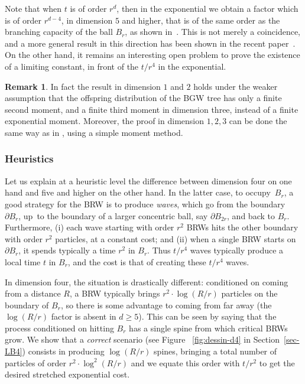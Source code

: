 \documentclass[11pt]{article}
\numberwithin{equation}{section}
\theoremstyle{plain}
\theoremstyle{definition}
\newtheorem{remark}[theorem]{Remark}
\newcommand{\1}{{\text{\Large $\mathfrak 1$}}}
\begin{document}
Note that when $t$ is of order $r^d$, then in the exponential we obtain a factor which is of order $r^{d-4}$, in dimension $5$ and higher, that is of the same order as the branching capacity of the ball $B_r$, as shown in~\cite{Zhu1}.
This is not merely a coincidence, and a more general result in this direction has been shown in the recent paper~\cite{ASS23}.
On the other hand, it remains an interesting open problem to prove the existence of a limiting constant, in front of the $t/r^4$ in the exponential.

\begin{remark}
In fact the result in dimension $1$ and $2$ holds under the weaker assumption that the offspring distribution of the BGW tree has only a finite second moment, and a finite third moment in dimension three, instead of a finite exponential moment. Moreover, the proof in dimension $1,2,3$ can be done the same way as in \cite{AHJ}, using a simple moment method.
\end{remark}

\subsubsection*{Heuristics}
Let us explain at a heuristic level the difference between
dimension four on one hand and five and higher on the other hand.
In the latter case, to occupy~$B_r$, a good strategy for the BRW is to produce
\emph{waves}, which go from the boundary~$\partial B_r$,
up~to the boundary of a larger concentric ball,
say $\partial B_{2r}$, and back to $B_r$.
Furthermore, (i) each wave starting with order $r^2$ BRWs
hits the other boundary with order $r^2$ particles, at a constant cost; and
(ii) when a single BRW starts on $\partial B_r$,
it spends typically a time $r^2$ in $B_r$.
Thus $t/r^4$ waves typically produce a local time $t$ in $B_r$, and
the cost is that of creating these $t/r^4$ waves.

In dimension four, the situation is drastically different: conditioned
on coming from a distance $R$, a BRW typically brings $r^2\cdot \log(R/r)$ particles on
the boundary of $B_r$, so there is some advantage to coming from
far away (the $\log(R/r)$ factor is absent in $d\ge 5$). This can be seen
by saying that the process conditioned on hitting $B_r$ has a single
spine from which critical BRWs grow. We show that a {\it correct} scenario
(see Figure ~\ref{fig:dessin-d4} in Section~\ref{sec-LB4})
consists in producing $\log(R/r)$ spines, bringing a total number
of particles of order $r^2\cdot \log^2(R/r)$ and we equate this order
with $t/r^2$ to get the desired stretched exponential cost.
\end{document}
